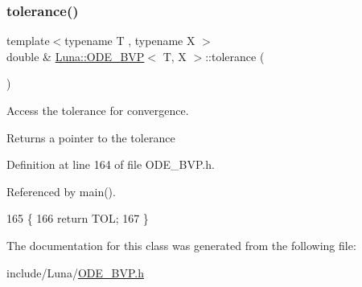 \subsubsection{\texorpdfstring{tolerance()}{tolerance()}}
{\footnotesize\ttfamily template$<$typename T , typename X $>$ \\
double \& \hyperlink{classLuna_1_1ODE__BVP}{Luna\+::\+O\+D\+E\+\_\+\+B\+VP}$<$ T, X $>$\+::tolerance (\begin{DoxyParamCaption}{ }\end{DoxyParamCaption})}



Access the tolerance for convergence. 

\begin{DoxyReturn}{Returns}
a pointer to the tolerance 
\end{DoxyReturn}


Definition at line 164 of file O\+D\+E\+\_\+\+B\+V\+P.\+h.



Referenced by main().


\begin{DoxyCode}
165   \{
166     \textcolor{keywordflow}{return} TOL;
167   \}
\end{DoxyCode}


The documentation for this class was generated from the following file\+:\begin{DoxyCompactItemize}
\item 
include/\+Luna/\hyperlink{ODE__BVP_8h}{O\+D\+E\+\_\+\+B\+V\+P.\+h}\end{DoxyCompactItemize}
